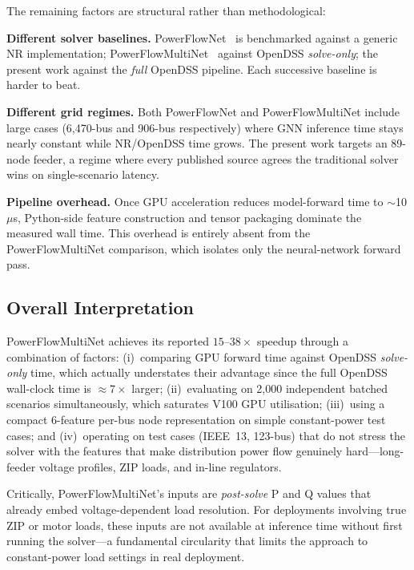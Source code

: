 \documentclass[11pt]{article}
\begin{document}
\medskip
\noindent
The remaining factors are structural rather than methodological:

\textbf{Different solver baselines.}
PowerFlowNet~\cite{Lin2024} is benchmarked against a generic NR
implementation; PowerFlowMultiNet~\cite{Ghamizi2024} against OpenDSS
\emph{solve-only}; the present work against the \emph{full} OpenDSS pipeline.
Each successive baseline is harder to beat.

\textbf{Different grid regimes.}
Both PowerFlowNet and PowerFlowMultiNet include large cases
(6,470-bus and 906-bus respectively) where GNN inference time stays nearly
constant while NR/OpenDSS time grows.  The present work targets an 89-node
feeder, a regime where every published source agrees the traditional solver
wins on single-scenario latency.

\textbf{Pipeline overhead.}
Once GPU acceleration reduces model-forward time to $\sim$10\;$\mu$s,
Python-side feature construction and tensor packaging dominate the measured
wall time.  This overhead is entirely absent from the PowerFlowMultiNet
comparison, which isolates only the neural-network forward pass.

\subsection{Overall Interpretation}

PowerFlowMultiNet achieves its reported $15$--$38\times$ speedup through a
combination of factors: (i)~comparing GPU forward time against
OpenDSS \emph{solve-only} time, which actually understates their advantage
since the full OpenDSS wall-clock time is ${\approx}7\times$ larger;
(ii)~evaluating on 2,000 independent batched scenarios simultaneously, which
saturates V100 GPU utilisation; (iii)~using a compact 6-feature per-bus node
representation on simple constant-power test cases; and (iv)~operating on
test cases (IEEE~13, 123-bus) that do not stress the solver with the features
that make distribution power flow genuinely hard---long-feeder voltage
profiles, ZIP loads, and in-line regulators.

Critically, PowerFlowMultiNet's inputs are \emph{post-solve} P and Q
values that already embed voltage-dependent load resolution.  For deployments
involving true ZIP or motor loads, these inputs are not available at inference
time without first running the solver---a fundamental circularity that limits
the approach to constant-power load settings in real deployment.
\end{document}
